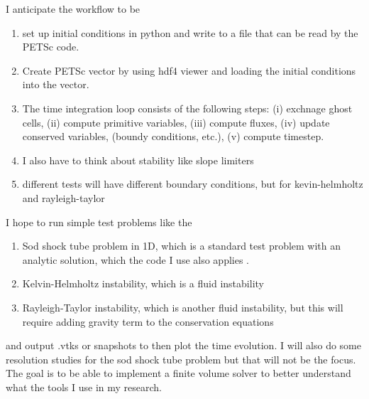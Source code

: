 \documentclass[12pt]{article}
\begin{document}
I anticipate the workflow to be 
\begin{enumerate}
    \item set up initial conditions in python and write to a file that can be read by the PETSc code.
    \item Create PETSc vector by using hdf4 viewer and loading the initial conditions into the vector.
    \item  The time integration loop consists of the following steps: (i) exchnage ghost cells, (ii) compute primitive variables, (iii) compute fluxes, (iv) update conserved variables, (boundy conditions, etc.), (v) compute timestep. 
    \item I also have to think about stability like slope limiters
    \item different tests will have different boundary conditions, but for kevin-helmholtz and rayleigh-taylor
\end{enumerate}
I hope to run simple test problems like the 
\begin{enumerate}
\item Sod shock tube problem in 1D, which is a standard test problem with an analytic solution, which the code I use also applies \citep{2010MNRAS.401..791S}. 
\item Kelvin-Helmholtz instability, which is a fluid instability 
\item Rayleigh-Taylor instability, which is another fluid instability, but this will require adding gravity term to the conservation equations
\end{enumerate}
and output .vtks or snapshots to then plot the time evolution. I will also do some resolution studies for the sod shock tube problem but that will not be the focus. The goal is to be able to implement a finite volume solver to better understand what the tools I use in my research.




\end{document}
